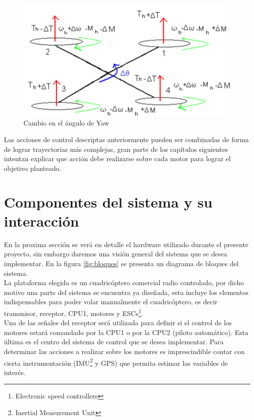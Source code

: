 \documentclass[main]{subfiles}
\begin{document}
\begin{figure}[!h]
\centering
\includegraphics[scale=0.5]{./pics_general/quad_theta.pdf}
\caption{Cambio en el \'angulo de Yaw}
\label{fig:quad_theta}
\end{figure}
Las acciones de control descriptas anteriormente pueden ser combinadas de forma de lograr trayectorias m\'as complejas, gran parte de los cap\'itulos siguientes intentan explicar que acci\'on debe realizarse sobre cada motor para lograr el objetivo planteado.

\section{Componentes del sistema y su interacci\'on}

En la proxima secci\'on se ver\'a en detalle el hardware utilizado durante el presente proyecto, sin embargo daremos una visi\'on general del sistema que se desea implementar. En la figura \ref{fig:bloques} se presenta un diagrama de bloques del sistema.\\


La plataforma elegida es un cuadric\'optero comercial radio controlado, por dicho motivo una parte del sistema se encuentra ya diseñada, esta incluye los elementos indispensables para poder volar manualmente el cuadric\'optero, es decir transmisor, receptor, CPU1, motores y ESCs\footnote{Electronic speed controllers}.\\   

Una de las señales del receptor ser\'a utilizada para definir si el control de los motores estar\'a comandado por la CPU1 o por la CPU2 (piloto autom\'atico). Esta \'ultima es el centro del sistema de control que se desea implementar. Para determinar las acciones a realizar sobre los motores es imprescindible contar con cierta instrumentaci\'on (IMU\footnote{Inertial Measurement Unit} y GPS) que permita estimar las variables de inter\'es.\\
\end{document}
